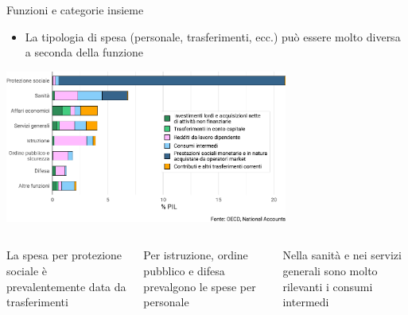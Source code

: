 \documentclass[aspectratio=64,12pt]{beamer}
\begin{document}
\begin{frame}{Funzioni e categorie insieme}
\begin{itemize}
\item La tipologia di spesa (personale, trasferimenti, ecc.) può essere molto diversa a seconda della funzione
\end{itemize}

\begin{center}
\includegraphics[height=5cm]{./figure/spesa-primaria-funzioni-categorie-ITA-color.pdf}
\end{center}

\vspace{-5mm}
\begin{columns}
\begin{column}{.33\columnwidth}
\begin{block}{}
\footnotesize\flushleft
La spesa per protezione sociale è prevalentemente data da trasferimenti
\end{block}
\end{column}

\begin{column}{.33\columnwidth}
\begin{block}{}
\footnotesize\flushleft
Per istruzione, ordine pubblico e difesa prevalgono le spese per personale
\end{block}
\end{column}

\begin{column}{.33\columnwidth}
\begin{block}{}
\footnotesize\flushleft
Nella sanità e nei servizi generali sono molto rilevanti i consumi intermedi
\end{block}
\end{column}
\end{columns}
\end{frame}
\end{document}

